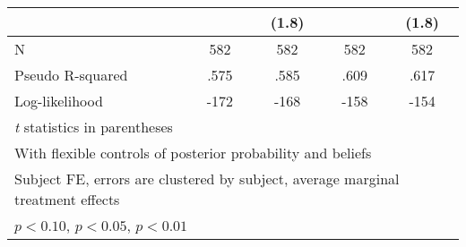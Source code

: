 \begin{table}[htbp]
\begin{tabular}{l*{4}{c}}
                &                  &    (1.8)         &                  &    (1.8)         \\
\hline
N               &      582         &      582         &      582         &      582         \\
Pseudo R-squared&     .575         &     .585         &     .609         &     .617         \\
Log-likelihood  &     -172         &     -168         &     -158         &     -154         \\
\hline\hline
\multicolumn{5}{l}{\footnotesize \textit{t} statistics in parentheses}\\
\multicolumn{5}{l}{\footnotesize With flexible controls of posterior probability and beliefs}\\
\multicolumn{5}{l}{\footnotesize Subject FE, errors are clustered by subject, average marginal treatment effects}\\
\multicolumn{5}{l}{\footnotesize \sym{*} \(p<0.10\), \sym{**} \(p<0.05\), \sym{***} \(p<0.01\)}\\
\end{tabular}
\end{table}
